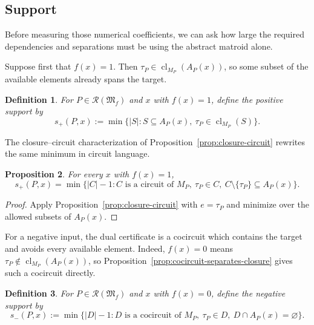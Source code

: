\documentclass[11pt]{article}
\numberwithin{equation}{section}
\newtheorem{definition}{Definition}[section]
\newtheorem{proposition}[definition]{Proposition}
\theoremstyle{remark}
\newcommand{\cl}{\operatorname{cl}}
\begin{document}
\subsection{Support}
\label{subsec:matroid-span-support}

Before measuring those numerical coefficients, we can ask how large the
required dependencies and separations must be using the abstract matroid
alone.

Suppose first that $f(x)=1$. Then
$\tau_P\in\cl_{M_P}(A_P(x))$, so some subset of the available elements
already spans the target.

\begin{definition}
\label{def:positive-support}
For $P\in\mathscr R(\mathfrak M_f)$ and $x$ with $f(x)=1$, define the
\emph{positive support} by
\begin{equation}
    s_+(P,x)
    :=
    \min
    \{
        |S|:
        S\subseteq A_P(x),\
        \tau_P\in\cl_{M_P}(S)
    \}.
\end{equation}
\end{definition}

The closure--circuit characterization of
Proposition~\ref{prop:closure-circuit} rewrites the same minimum in circuit
language.

\begin{proposition}
\label{prop:positive-support-circuits}
For every $x$ with $f(x)=1$,
\begin{equation}
    s_+(P,x)
    =
    \min
    \{
        |C|-1:
        C\text{ is a circuit of }M_P,\
        \tau_P\in C,\
        C\setminus\{\tau_P\}\subseteq A_P(x)
    \}.
\end{equation}
\end{proposition}

\begin{proof}
Apply Proposition~\ref{prop:closure-circuit} with $e=\tau_P$ and minimize
over the allowed subsets of $A_P(x)$.
\end{proof}

For a negative input, the dual certificate is a cocircuit which contains the
target and avoids every available element. Indeed,
$f(x)=0$ means
$\tau_P\notin\cl_{M_P}(A_P(x))$, so
Proposition~\ref{prop:cocircuit-separates-closure} gives such a cocircuit
directly.

\begin{definition}
\label{def:negative-support}
For $P\in\mathscr R(\mathfrak M_f)$ and $x$ with $f(x)=0$, define the
\emph{negative support} by
\begin{equation}
    s_-(P,x)
    :=
    \min
    \{
        |D|-1:
        D\text{ is a cocircuit of }M_P,\
        \tau_P\in D,\
        D\cap A_P(x)=\varnothing
    \}.
\end{equation}
\end{definition}
\end{document}
